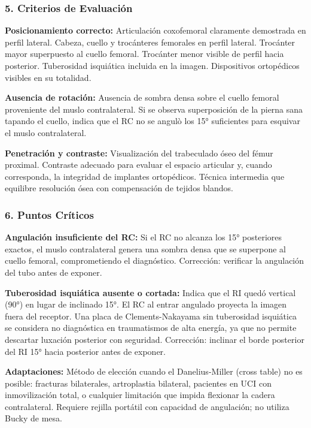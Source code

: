	\subsubsection*{5. Criterios de Evaluación}
	
	\textbf{Posicionamiento correcto:} Articulación coxofemoral claramente demostrada en perfil lateral. Cabeza, cuello y trocánteres femorales en perfil lateral. Trocánter mayor superpuesto al cuello femoral. Trocánter menor visible de perfil hacia posterior. Tuberosidad isquiática incluida en la imagen. Dispositivos ortopédicos visibles en su totalidad.
	
	\textbf{Ausencia de rotación:} Ausencia de sombra densa sobre el cuello femoral proveniente del muslo contralateral. Si se observa superposición de la pierna sana tapando el cuello, indica que el RC no se angulò los 15° suficientes para esquivar el muslo contralateral.
	
	\textbf{Penetración y contraste:} Visualización del trabeculado óseo del fémur proximal. Contraste adecuado para evaluar el espacio articular y, cuando corresponda, la integridad de implantes ortopédicos. Técnica intermedia que equilibre resolución ósea con compensación de tejidos blandos.
	
	\subsubsection*{6. Puntos Críticos}
	
	\textbf{Angulación insuficiente del RC:} Si el RC no alcanza los 15° posteriores exactos, el muslo contralateral genera una sombra densa que se superpone al cuello femoral, comprometiendo el diagnóstico. Corrección: verificar la angulación del tubo antes de exponer.
	
	\textbf{Tuberosidad isquiática ausente o cortada:} Indica que el RI quedó vertical (90°) en lugar de inclinado 15°. El RC al entrar angulado proyecta la imagen fuera del receptor. Una placa de Clements-Nakayama sin tuberosidad isquiática se considera no diagnóstica en traumatismos de alta energía, ya que no permite descartar luxación posterior con seguridad. Corrección: inclinar el borde posterior del RI 15° hacia posterior antes de exponer.
	
	\textbf{Adaptaciones:} Método de elección cuando el Danelius-Miller (cross table) no es posible: fracturas bilaterales, artroplastia bilateral, pacientes en UCI con inmovilización total, o cualquier limitación que impida flexionar la cadera contralateral. Requiere rejilla portátil con capacidad de angulación; no utiliza Bucky de mesa.
	
